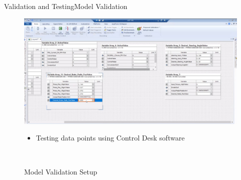 \documentclass{beamer}
\begin{document}
\begin{frame}{Validation and Testing}{Model Validation}
	\begin{figure}
		\centering \includegraphics[width=.45\linewidth]{figs/img/aStuffValidationBrakeModel}\quad%
		\caption{Model Validation Setup}
    			\label{fig:validationSetup}
		\centering \begin{minipage}[b][0.4\textheight][c]{.45\linewidth} \begin{itemize} \item Testing data points using Control Desk software  \end{itemize} \end{minipage}\\[1em]
	\end{figure}
\end{frame}

\end{document}
